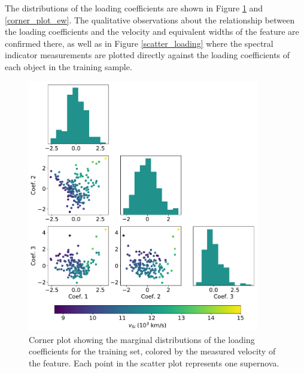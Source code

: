 The distributions of the loading coefficients are shown in Figure \ref{corner_plot_vel} and \ref{corner_plot_ew}. The qualitative observations about the relationship between the loading coefficients and the velocity and equivalent widths of the feature are confirmed there, as well as in Figure \ref{scatter_loading} where the spectral indicator measurements are plotted directly against the loading coefficients of each object in the training sample.

\begin{figure}[htbp]
    \centering
    \includegraphics[width=0.9\textwidth]{figures/si_feat_pca/corner_plot_vel.pdf}
    \caption{Corner plot showing the marginal distributions of the loading coefficients for the training set, colored by the measured velocity of the \siliconii{} feature. Each point in the scatter plot represents one supernova.}
    \label{corner_plot_vel}
\end{figure}

